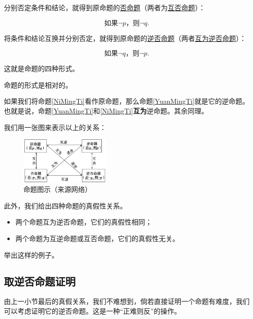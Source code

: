 \documentclass[lang=cn,math=cm,chinesefont=nofont,11pt,scheme=chinese,twocol]{elegantbook}
\begin{document}
分别否定条件和结论，就得到原命题的\underline{否命题}（两者为\underline{互否命题}）：

\begin{equation}\label{FouMingTi}
  \text{如果}\neg p\text{，则}\neg q.
\end{equation}

将条件和结论互换并分别否定，就得到原命题的\underline{逆否命题}（两者\underline{互为逆否命题}）：

\begin{equation}\label{NiFouMingTi}
  \text{如果}\neg q\text{，则}\neg p.
\end{equation}

这就是命题的四种形式。

命题的形式是相对的。

如果我们将命题\ref{NiMingTi}看作原命题，那么命题\ref{YuanMingTi}就是它的逆命题。也就是说，命题\ref{YuanMingTi}和\ref{NiMingTi}\textbf{互为}逆命题。其余同理。

我们用一张图来表示以上的关系：

\begin{figure}[h]
  \centering
  \includegraphics[width=0.4\textwidth]{image/proposition.png}
  \caption{命题图示（来源网络）}
  \label{img:proposition}
\end{figure}

此外，我们给出四种命题的真假性关系。

\begin{itemize}
  \item 两个命题互为逆否命题，它们的真假性相同；
  \item 两个命题为互逆命题或互否命题，它们的真假性无关。
\end{itemize}

\begin{problem}
  举出这样的例子。
\end{problem}

\subsection{取逆否命题证明}

由上一小节最后的真假关系，我们不难想到，倘若直接证明一个命题有难度，我们可以考虑证明它的逆否命题。这是一种“正难则反”的操作。
\end{document}

